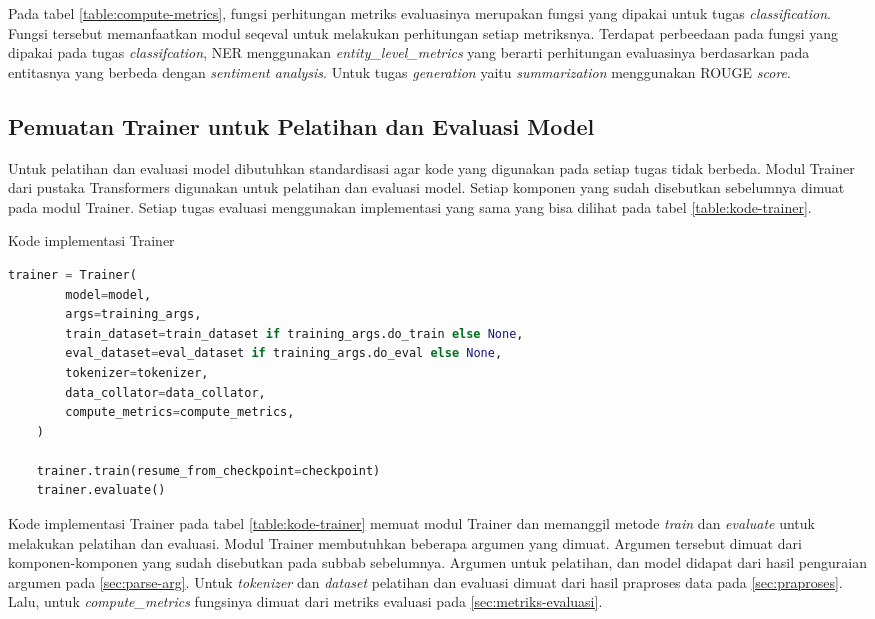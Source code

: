 Pada tabel \ref{table:compute-metrics}, fungsi perhitungan metriks evaluasinya merupakan fungsi yang dipakai untuk tugas \textit{classification}. Fungsi tersebut memanfaatkan modul seqeval untuk melakukan perhitungan setiap metriksnya. Terdapat perbeedaan pada fungsi yang dipakai pada tugas \textit{classifcation}, NER menggunakan \textit{entity\_level\_metrics} yang berarti perhitungan evaluasinya berdasarkan pada entitasnya yang berbeda dengan \textit{sentiment analysis}. Untuk tugas \textit{generation} yaitu \textit{summarization} menggunakan ROUGE \textit{score}.

\subsection{Pemuatan Trainer untuk Pelatihan dan Evaluasi Model}

Untuk pelatihan dan evaluasi model dibutuhkan standardisasi agar kode yang digunakan pada setiap tugas tidak berbeda. Modul Trainer dari pustaka Transformers digunakan untuk pelatihan dan evaluasi model. Setiap komponen yang sudah disebutkan sebelumnya  dimuat pada modul Trainer. Setiap tugas evaluasi  menggunakan implementasi yang sama yang bisa dilihat pada tabel \ref{table:kode-trainer}.

\begin{table}[h]
    \caption{Kode implementasi Trainer}
    \label{table:kode-trainer}
    \begin{lstlisting}[language=python]
    trainer = Trainer(
        model=model,
        args=training_args,
        train_dataset=train_dataset if training_args.do_train else None,
        eval_dataset=eval_dataset if training_args.do_eval else None,
        tokenizer=tokenizer,
        data_collator=data_collator,
        compute_metrics=compute_metrics,
    )

    trainer.train(resume_from_checkpoint=checkpoint)
    trainer.evaluate()
    \end{lstlisting}
\end{table}

Kode implementasi Trainer pada tabel \ref{table:kode-trainer} memuat modul Trainer dan memanggil metode \textit{train} dan \textit{evaluate} untuk melakukan pelatihan dan evaluasi. Modul Trainer membutuhkan beberapa argumen yang dimuat. Argumen tersebut dimuat dari komponen-komponen yang sudah disebutkan pada subbab sebelumnya. Argumen untuk pelatihan, dan model didapat dari hasil penguraian argumen pada \ref{sec:parse-arg}. Untuk \textit{tokenizer} dan \textit{dataset} pelatihan dan evaluasi dimuat dari hasil praproses data pada \ref{sec:praproses}. Lalu, untuk \textit{compute\_metrics} fungsinya dimuat dari metriks evaluasi pada \ref{sec:metriks-evaluasi}. 

